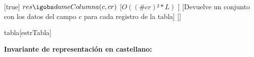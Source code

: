 \begin{Interfaz}
   [true] %
   {$res \igobs dameColumna(c,cr)$} %
   [$O((\#cr)²*L)$ ] %
   [Devuelve un conjunto con los datos del campo $c$ para cada registro de la tabla] %
   [] %
  
  
\end{Interfaz}

\begin{Representacion}

  \begin{Estructura}{tabla}[estrTabla]

    \begin{Tupla}[estrTabla]


    
    
	\end{Tupla}

  \end{Estructura}
  
\textbf{Invariante de representaci\'on en castellano:}


\end{Representacion}
